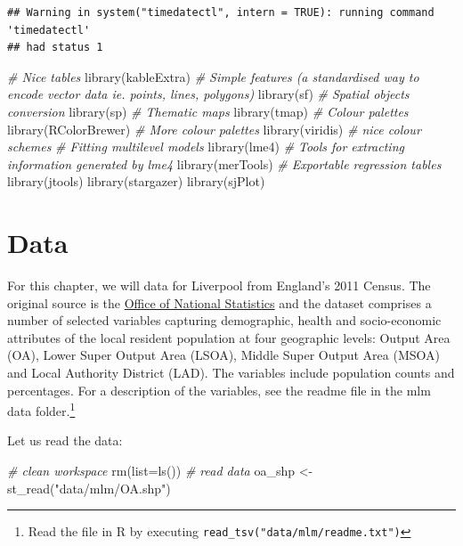 \documentclass[
]{book}
\newenvironment{Shaded}{\begin{snugshade}}{\end{snugshade}}
\newcommand{\AttributeTok}[1]{\textcolor[rgb]{0.77,0.63,0.00}{#1}}
\newcommand{\CommentTok}[1]{\textcolor[rgb]{0.56,0.35,0.01}{\textit{#1}}}
\newcommand{\FunctionTok}[1]{\textcolor[rgb]{0.00,0.00,0.00}{#1}}
\newcommand{\NormalTok}[1]{#1}
\newcommand{\OtherTok}[1]{\textcolor[rgb]{0.56,0.35,0.01}{#1}}
\newcommand{\StringTok}[1]{\textcolor[rgb]{0.31,0.60,0.02}{#1}}
\begin{document}
\begin{verbatim}
## Warning in system("timedatectl", intern = TRUE): running command 'timedatectl'
## had status 1
\end{verbatim}

\begin{Shaded}
\begin{Highlighting}[]
\CommentTok{\# Nice tables}
\FunctionTok{library}\NormalTok{(kableExtra)}
\CommentTok{\# Simple features (a standardised way to encode vector data ie. points, lines, polygons)}
\FunctionTok{library}\NormalTok{(sf) }
\CommentTok{\# Spatial objects conversion}
\FunctionTok{library}\NormalTok{(sp) }
\CommentTok{\# Thematic maps}
\FunctionTok{library}\NormalTok{(tmap) }
\CommentTok{\# Colour palettes}
\FunctionTok{library}\NormalTok{(RColorBrewer) }
\CommentTok{\# More colour palettes}
\FunctionTok{library}\NormalTok{(viridis) }\CommentTok{\# nice colour schemes}
\CommentTok{\# Fitting multilevel models}
\FunctionTok{library}\NormalTok{(lme4)}
\CommentTok{\# Tools for extracting information generated by lme4}
\FunctionTok{library}\NormalTok{(merTools)}
\CommentTok{\# Exportable regression tables}
\FunctionTok{library}\NormalTok{(jtools)}
\FunctionTok{library}\NormalTok{(stargazer)}
\FunctionTok{library}\NormalTok{(sjPlot)}
\end{Highlighting}
\end{Shaded}

\hypertarget{data-3}{%
\section{Data}\label{data-3}}

For this chapter, we will data for Liverpool from England's 2011 Census. The original source is the \href{https://www.nomisweb.co.uk/home/census2001.asp}{Office of National Statistics} and the dataset comprises a number of selected variables capturing demographic, health and socio-economic attributes of the local resident population at four geographic levels: Output Area (OA), Lower Super Output Area (LSOA), Middle Super Output Area (MSOA) and Local Authority District (LAD). The variables include population counts and percentages. For a description of the variables, see the readme file in the mlm data folder.\footnote{Read the file in R by executing \texttt{read\_tsv("data/mlm/readme.txt")}}

Let us read the data:

\begin{Shaded}
\begin{Highlighting}[]
\CommentTok{\# clean workspace}
\FunctionTok{rm}\NormalTok{(}\AttributeTok{list=}\FunctionTok{ls}\NormalTok{())}
\CommentTok{\# read data}
\NormalTok{oa\_shp }\OtherTok{\textless{}{-}} \FunctionTok{st\_read}\NormalTok{(}\StringTok{"data/mlm/OA.shp"}\NormalTok{)}
\end{Highlighting}
\end{Shaded}
\end{document}
